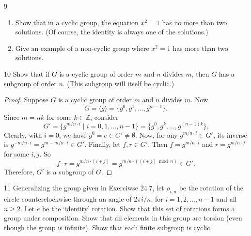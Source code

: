 \begin{problem}{9}
    \begin{enumerate}
        \item[(a)] Show that in a cyclic group, the equation $x^2 = 1$ has no more than two
        solutions. (Of course, the identity is always one of the solutions.)
        \item[(b)] Give an example of a non-cyclic group where $x^2 = 1$ has more than two
        solutions.
    \end{enumerate}
\end{problem}
\unsolved

\begin{problem}{10}
    Show that if $G$ is a cyclic group of order $m$ and $n$ divides $m$, then $G$
    has a subgroup of order $n$. (This subgroup will itself be cyclic.)
\end{problem}
\solved

\begin{proof}
    Suppose $G$ is a cyclic group of order $m$ and $n$ divides $m$.
    Now 
    \[G = \langle g \rangle = \{ g^0, g^1, \ldots, g^{m-1} \}.\]
    Since $m = n k$ for some $k \in \mathbb{Z}$, consider 
    \[G' = \{g^{m/n \cdot i} \mid i = 0, 1, \dots, n-1\} = \{ g^0, g^k, \ldots, g^{(n - 1)k} \}.\]
    Clearly, with $i = 0$, we have $g^0 = e \in G' \ne \emptyset$.
    Now, for any $g^{m/n \cdot i} \in G'$, its inverse is $g^{-m/n \cdot i} = g^{m - m/n \cdot i} \in G'$. 
    Finally, let $f, r \in G'$. Then $f = g^{m/n \cdot i}$ and $r = g^{m/n \cdot j}$ for some $i, j$.
    So 
    \[f \cdot r = g^{m/n \cdot (i+j)} = g^{m/n \cdot ((i+j) \bmod n)} \in G'.\]
    Therefore, $G'$ is a subgroup of $G$.
\end{proof}

\begin{problem}{11}
    Generalizing the group given in Exerciwse 24.7, let $\rho_{i, n}$ be the 
    rotation of the circle counterclockwise through an angle of $2 \pi i / n$,
    for $i = 1, 2, \ldots, n - 1$ and all $n \ge 2$. Let $e$ be the `identity'
    rotation. Show that this set of rotations forms a group under composition.
    Show that all elements in this group are torsion (even though the group is infinite).
    Show that each finite subgroup is cyclic.
\end{problem}
\solved

